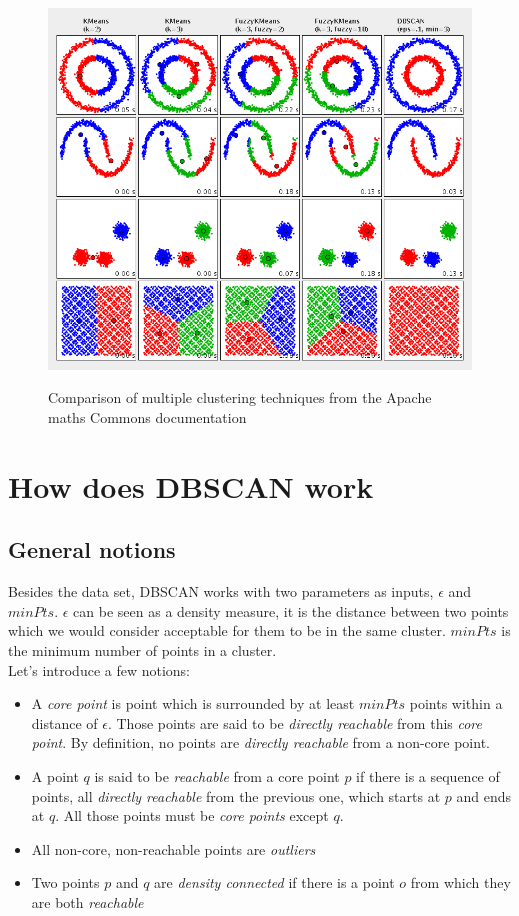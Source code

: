 \begin{figure}
\centering
{\includegraphics[width=6in]{images/cluster_comparison.png}}
\caption{Comparison of multiple clustering techniques from the Apache maths Commons documentation\cite{apachecluster}}
\label{fig:clustComp}
\end{figure}

\section{How does DBSCAN work}
\subsection{General notions}
Besides the data set, DBSCAN works with two parameters as inputs, $\epsilon$ and $minPts$. $\epsilon$ can be seen as a density measure, it is the distance between two points which we would consider acceptable for them to be in the same cluster. $minPts$ is the minimum number of points in a cluster.\\
Let's introduce a few notions\cite{dbscan}:
\begin{itemize}
	\item A \emph{core point} is point which is surrounded by at least $minPts$ points within a distance of $\epsilon$. Those points are said to be \emph{directly reachable} from this \emph{core point}. By definition, no points are \emph{directly reachable} from a non-core point.
	\item A point $q$ is said to be \emph{reachable} from a core point $p$ if there is a sequence of points, all \emph{directly reachable} from the previous one, which starts at $p$ and ends at $q$. All those points must be \emph{core points} except $q$.
	\item All non-core, non-reachable points are \emph{outliers}
	\item Two points $p$ and $q$ are \emph{density connected} if there is a point $o$ from which they are both \emph{reachable}
\end{itemize}

